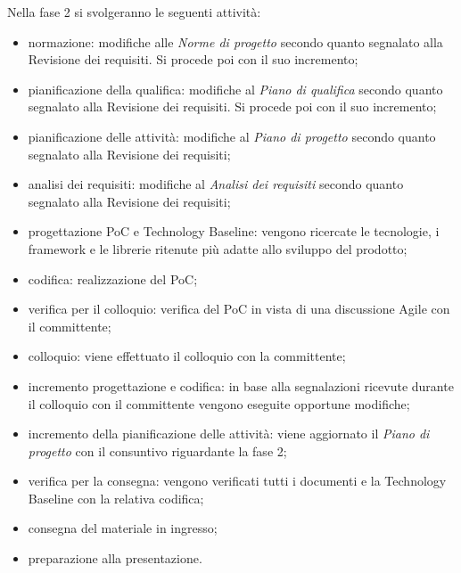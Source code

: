 Nella fase 2 si svolgeranno le seguenti attività:
\begin{itemize}
	\item normazione: modifiche alle \textit{Norme di progetto} secondo quanto segnalato alla Revisione dei requisiti. Si procede poi con il suo incremento;
	\item pianificazione della qualifica: modifiche al \textit{Piano di qualifica} secondo quanto segnalato alla Revisione dei requisiti. Si procede poi con il suo incremento;
	\item pianificazione delle attività: modifiche al \textit{Piano di progetto} secondo quanto segnalato alla Revisione dei requisiti;
	\item analisi dei requisiti: modifiche al \textit{Analisi dei requisiti} secondo quanto segnalato alla Revisione dei requisiti;
	\item progettazione PoC e Technology Baseline: vengono ricercate le tecnologie, i framework e le librerie ritenute più adatte allo sviluppo del prodotto;
	\item codifica: realizzazione del PoC;
	\item verifica per il colloquio: verifica del PoC in vista di una discussione Agile con il committente;
	\item colloquio: viene effettuato il colloquio con la committente;
	\item incremento progettazione e codifica: in base alla segnalazioni ricevute durante il colloquio con il committente vengono eseguite opportune modifiche;
	\item incremento della pianificazione delle attività: viene aggiornato il \textit{Piano di progetto} con il consuntivo riguardante la fase 2;
	\item verifica per la consegna: vengono verificati tutti i documenti e la Technology Baseline con la relativa codifica;
	\item consegna del materiale in ingresso;
	\item preparazione alla presentazione.
\end{itemize}